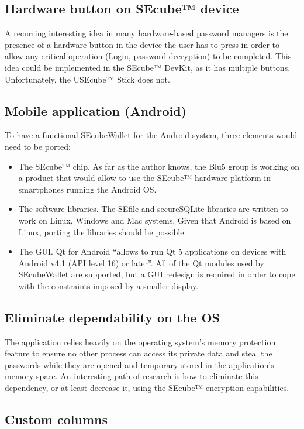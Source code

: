 \subsection{Hardware button on SEcube™ device}
A recurring interesting idea in many hardware-based password managers is the presence of a hardware button in the  device the user has to press in order to allow any critical operation (Login, password decryption) to be completed. This idea could be implemented in the SEcube™ DevKit, as it has multiple buttons. Unfortunately, the USEcube™ Stick does not.

\subsection{Mobile application (Android)}
To have a functional SEcubeWallet for the Android system, three elements would need to be ported:
\begin{itemize}
\item The SEcube™ chip. As far as the author knows, the Blu5 group is working on a product that would allow to use the SEcube™ hardware platform in smartphones running the Android OS.
\item The software libraries. The SEfile and secureSQLite libraries are written to work on Linux, Windows and Mac systems. Given that Android is based on Linux, porting the libraries should be possible.
\item The GUI. Qt for Android \cite{android} ``allows to run Qt 5 applications on devices with Android v4.1 (API level 16) or later''. All of the Qt modules used by SEcubeWallet are supported, but a GUI redesign is required in order to cope with the constraints imposed by a smaller display.
\end{itemize}

\subsection{Eliminate dependability on the OS}

The application relies heavily on the operating system's memory protection feature to ensure no other process can access its private data and steal the passwords while they are opened and temporary stored in the application's memory space. An interesting path of research is how to eliminate this dependency, or at least decrease it, using the SEcube™ encryption capabilities.

\subsection{Custom columns}

